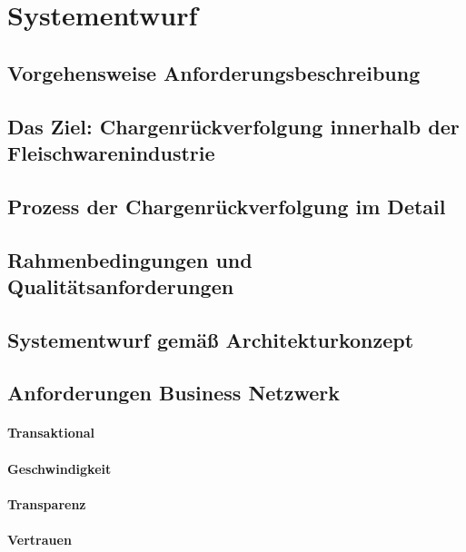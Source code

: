 \section{Systementwurf}

\subsection{Vorgehensweise Anforderungsbeschreibung}

\subsection{Das Ziel: Chargenrückverfolgung innerhalb der Fleischwarenindustrie}

\subsection{Prozess der Chargenrückverfolgung im Detail}

\subsection{Rahmenbedingungen und Qualitätsanforderungen}

\subsection{Systementwurf gemäß Architekturkonzept}

\subsection{Anforderungen Business Netzwerk}

\paragraph{Transaktional}

\paragraph{Geschwindigkeit}

\paragraph{Transparenz}

\paragraph{Vertrauen}

